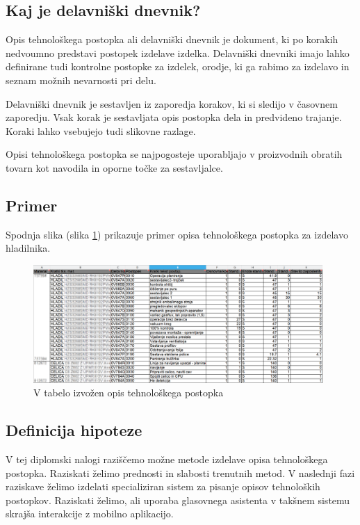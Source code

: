 \documentclass[a4paper, 12pt]{book}
\begin{document}
\subsection {Kaj je delavniški dnevnik?}

Opis tehnološkega postopka ali delavniški dnevnik je dokument, ki po korakih nedvoumno predstavi postopek izdelave izdelka.
Delavniški dnevniki imajo lahko definirane tudi kontrolne postopke za izdelek, orodje, ki ga rabimo za izdelavo in seznam možnih nevarnosti pri delu.

Delavniški dnevnik je sestavljen iz zaporedja korakov, ki si sledijo v časovnem zaporedju.
Vsak korak je sestavljata opis postopka dela in predvideno trajanje.
Koraki lahko vsebujejo tudi slikovne razlage.

Opisi tehnološkega postopka se najpogosteje uporabljajo v proizvodnih obratih tovarn kot navodila in oporne točke za sestavljalce.

\subsection{Primer}
Spodnja slika (slika \ref{sap_2}) prikazuje primer opisa tehnološkega postopka za izdelavo hladilnika.

\begin{figure}[H]
\begin{center}
\includegraphics[width=11cm]{sap_2}
\end{center}
\caption{V tabelo izvožen opis tehnološkega postopka}
\label{sap_2}
\end{figure}



\subsection{Definicija hipoteze}

V tej diplomski nalogi raziščemo možne metode izdelave opisa tehnološkega postopka.
Raziskati želimo prednosti in slabosti trenutnih metod.
V naslednji fazi raziskave želimo izdelati specializiran sistem za pisanje opisov tehnoloških postopkov.
Raziskati želimo, ali uporaba glasovnega asistenta v takšnem sistemu skrajša interakcije z mobilno aplikacijo.
\end{document}
